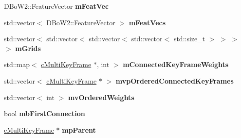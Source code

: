 \begin{DoxyCompactItemize}
\item 
D\+Bo\+W2\+::\+Feature\+Vector {\bfseries m\+Feat\+Vec}\hypertarget{classMultiColSLAM_1_1cMultiKeyFrame_a5aeb07e9c7a50d418587eefa8ba9d103}{}\label{classMultiColSLAM_1_1cMultiKeyFrame_a5aeb07e9c7a50d418587eefa8ba9d103}

\item 
std\+::vector$<$ D\+Bo\+W2\+::\+Feature\+Vector $>$ {\bfseries m\+Feat\+Vecs}\hypertarget{classMultiColSLAM_1_1cMultiKeyFrame_a9de04c2fa55e6b6ff2dc26b0ffdffb38}{}\label{classMultiColSLAM_1_1cMultiKeyFrame_a9de04c2fa55e6b6ff2dc26b0ffdffb38}

\item 
std\+::vector$<$ std\+::vector$<$ std\+::vector$<$ std\+::vector$<$ std\+::size\+\_\+t $>$ $>$ $>$ $>$ {\bfseries m\+Grids}\hypertarget{classMultiColSLAM_1_1cMultiKeyFrame_a23877b30db6777106c47ac74eb80c0fd}{}\label{classMultiColSLAM_1_1cMultiKeyFrame_a23877b30db6777106c47ac74eb80c0fd}

\item 
std\+::map$<$ \hyperlink{classMultiColSLAM_1_1cMultiKeyFrame}{c\+Multi\+Key\+Frame} $\ast$, int $>$ {\bfseries m\+Connected\+Key\+Frame\+Weights}\hypertarget{classMultiColSLAM_1_1cMultiKeyFrame_a3d83dcebee9a6027bc48a900a7a4595b}{}\label{classMultiColSLAM_1_1cMultiKeyFrame_a3d83dcebee9a6027bc48a900a7a4595b}

\item 
std\+::vector$<$ \hyperlink{classMultiColSLAM_1_1cMultiKeyFrame}{c\+Multi\+Key\+Frame} $\ast$ $>$ {\bfseries mvp\+Ordered\+Connected\+Key\+Frames}\hypertarget{classMultiColSLAM_1_1cMultiKeyFrame_ac34d012b5cb31754ee32061ebabc85a0}{}\label{classMultiColSLAM_1_1cMultiKeyFrame_ac34d012b5cb31754ee32061ebabc85a0}

\item 
std\+::vector$<$ int $>$ {\bfseries mv\+Ordered\+Weights}\hypertarget{classMultiColSLAM_1_1cMultiKeyFrame_ae16c46fb46f4c3d2f66c7d8b213ac315}{}\label{classMultiColSLAM_1_1cMultiKeyFrame_ae16c46fb46f4c3d2f66c7d8b213ac315}

\item 
bool {\bfseries mb\+First\+Connection}\hypertarget{classMultiColSLAM_1_1cMultiKeyFrame_ac6a1de20903430699ed2428960879794}{}\label{classMultiColSLAM_1_1cMultiKeyFrame_ac6a1de20903430699ed2428960879794}

\item 
\hyperlink{classMultiColSLAM_1_1cMultiKeyFrame}{c\+Multi\+Key\+Frame} $\ast$ {\bfseries mp\+Parent}\hypertarget{classMultiColSLAM_1_1cMultiKeyFrame_aabf55dcc84d8491d3e93d8ef4f0bf24a}{}\label{classMultiColSLAM_1_1cMultiKeyFrame_aabf55dcc84d8491d3e93d8ef4f0bf24a}


\end{DoxyCompactItemize}
